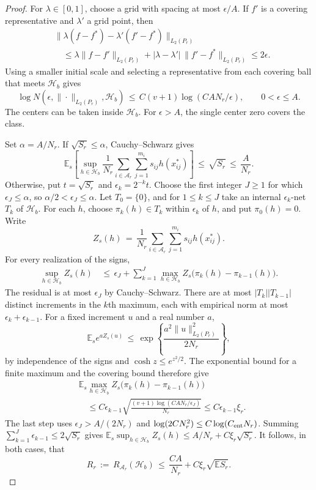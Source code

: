 \documentclass[twoside,11pt]{article}
\newenvironment{revision}{\color{revisionred}}{}
\begin{document}
\begin{revision}
\begin{proof}
For $\lambda\in[0,1]$, choose a grid with spacing at most $\epsilon/A$.
If $f'$ is a covering representative and $\lambda'$ a grid point, then
\[
\begin{aligned}
&\|\lambda(f-f^*)-\lambda'(f'-f^*)\|_{L_2(P_r)}\\
&\quad\le
\lambda\|f-f'\|_{L_2(P_r)}
+|\lambda-\lambda'|\,\|f'-f^*\|_{L_2(P_r)}
\le2\epsilon.
\end{aligned}
\]
Using a smaller initial scale and selecting a representative from each
covering ball that meets $\mathcal H_b$ gives
\[
\log N(\epsilon,\|\cdot\|_{L_2(P_r)},\mathcal H_b)
\,\le\,
C(v+1)\log(CAN_r/\epsilon),
\qquad 0<\epsilon\le A.
\]
The centers can be taken inside $\mathcal H_b$.
For $\epsilon>A$, the single center zero covers the class.

Set $\alpha=A/N_r$. If $\sqrt{S_r}\le\alpha$, Cauchy--Schwarz gives
\[
\mathbb E_s\left[
\sup_{h\in\mathcal H_b}
\frac1{N_r}\sum_{i\in\mathcal A_r}\sum_{j=1}^{m_i}
s_{ij}h(x_{ij}^*)\right]
\,\le\,\sqrt{S_r}\,\le\,\frac A{N_r}.
\]
Otherwise, put $t=\sqrt{S_r}$ and
$\epsilon_k=2^{-k}t$. Choose the first integer $J\ge1$ for which
$\epsilon_J\le\alpha$, so $\alpha/2<\epsilon_J\le\alpha$.
Let $T_0=\{0\}$, and for $1\le k\le J$ take an internal
$\epsilon_k$-net $T_k$ of $\mathcal H_b$.
For each $h$, choose $\pi_k(h)\in T_k$ within $\epsilon_k$ of $h$,
and put $\pi_0(h)=0$.
Write
\[
Z_s(h)
\,=\,
\frac1{N_r}\sum_{i\in\mathcal A_r}\sum_{j=1}^{m_i}s_{ij}h(x_{ij}^*).
\]
For every realization of the signs,
\[
\begin{aligned}
\sup_{h\in\mathcal H_b}Z_s(h)
&\,\le\,\epsilon_J+
\sum_{k=1}^J
\max_{h\in\mathcal H_b}Z_s\bigl(\pi_k(h)-\pi_{k-1}(h)\bigr).
\end{aligned}
\]
The residual is at most $\epsilon_J$ by Cauchy--Schwarz.
There are at most $|T_k||T_{k-1}|$ distinct increments in the
$k$th maximum, each with empirical norm at most
$\epsilon_k+\epsilon_{k-1}$.
For a fixed increment $u$ and a real number $a$,
\[
\mathbb E_s e^{aZ_s(u)}
\,\le\,
\exp\left\{\frac{a^2\|u\|_{L_2(P_r)}^2}{2N_r}\right\},
\]
by independence of the signs and $\cosh z\le e^{z^2/2}$.
The exponential bound for a finite maximum and the covering bound
therefore give
\[
\begin{aligned}
&\mathbb E_s\max_{h\in\mathcal H_b}
Z_s\bigl(\pi_k(h)-\pi_{k-1}(h)\bigr)\\
&\quad\le
C\epsilon_{k-1}
\sqrt{\frac{(v+1)\log(CAN_r/\epsilon_J)}{N_r}}
\le C\epsilon_{k-1}\xi_r.
\end{aligned}
\]
The last step uses $\epsilon_J>A/(2N_r)$ and
$\log(2CN_r^2)\le C\log(C_{\rm ent}N_r)$.
Summing $\sum_{k=1}^J\epsilon_{k-1}\le2\sqrt{S_r}$ gives
$\mathbb E_s\sup_{h\in\mathcal H_b}Z_s(h)
\le A/N_r+C\xi_r\sqrt{S_r}$.
It follows, in both cases, that
\[
R_r
\, := \,
R_{\mathcal A_r}(\mathcal H_b)
\,\le\,
\frac{CA}{N_r}+C\xi_r\sqrt{\mathbb E S_r}.
\]


\end{proof}
\end{revision}
\end{document}
